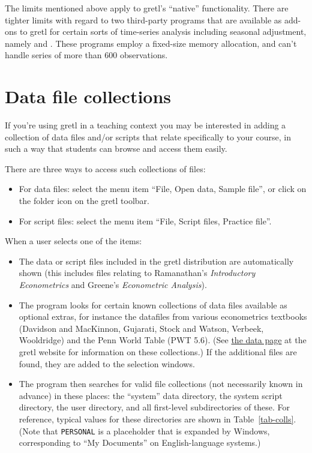 The limits mentioned above apply to gretl's ``native''
functionality.  There are tighter limits with regard to two
third-party programs that are available as add-ons to gretl for
certain sorts of time-series analysis including seasonal adjustment,
namely  and .  These programs employ
a fixed-size memory allocation, and can't handle series of more than
600 observations.


\section{Data file collections}
\label{collections}

If you're using gretl in a teaching context you may be
interested in adding a collection of data files and/or scripts that
relate specifically to your course, in such a way that students can
browse and access them easily.

There are three ways to access such collections of files:

\begin{itemize}
\item For data files: select the menu item ``File, Open data, Sample
  file'', or click on the folder icon on the gretl toolbar.
\item For script files: select the menu item ``File, Script
  files, Practice file''.
\end{itemize}

When a user selects one of the items:

\begin{itemize}
\item The data or script files included in the gretl distribution are
  automatically shown (this includes files relating to Ramanathan's
  \emph{Introductory Econometrics} and Greene's \emph{Econometric
    Analysis}).
\item The program looks for certain known collections of data files
  available as optional extras, for instance the datafiles from
  various econometrics textbooks (Davidson and MacKinnon, Gujarati,
  Stock and Watson, Verbeek, Wooldridge) and the Penn World Table (PWT
  5.6).  (See \href{http://gretl.sourceforge.net/gretl_data.html}{the
    data page} at the gretl website for information on these
  collections.)  If the additional files are found, they are added to
  the selection windows.
\item The program then searches for valid file collections (not
  necessarily known in advance) in these places: the ``system'' data
  directory, the system script directory, the user directory, and all
  first-level subdirectories of these.  For reference, typical values
  for these directories are shown in Table~\ref{tab-colls}.  (Note that
  \texttt{PERSONAL} is a placeholder that is expanded by Windows,
  corresponding to ``My Documents'' on English-language systems.)
\end{itemize}

